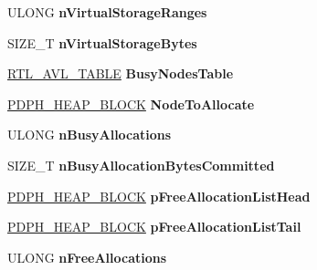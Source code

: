 \begin{DoxyCompactItemize}
U\+L\+O\+NG {\bfseries n\+Virtual\+Storage\+Ranges}
\item 
\mbox{\label{struct___d_p_h___h_e_a_p___r_o_o_t_af2c1adcebb06d8c3f59a7908e19c7254}} 
S\+I\+Z\+E\+\_\+T {\bfseries n\+Virtual\+Storage\+Bytes}
\item 
\mbox{\label{struct___d_p_h___h_e_a_p___r_o_o_t_aee63a9ea28ea465d0c269dd453b656b7}} 
\hyperlink{struct___r_t_l___a_v_l___t_a_b_l_e}{R\+T\+L\+\_\+\+A\+V\+L\+\_\+\+T\+A\+B\+LE} {\bfseries Busy\+Nodes\+Table}
\item 
\mbox{\label{struct___d_p_h___h_e_a_p___r_o_o_t_a3efe9f8864dd0c05b7c6e4eddb994f35}} 
\hyperlink{struct___d_p_h___h_e_a_p___b_l_o_c_k}{P\+D\+P\+H\+\_\+\+H\+E\+A\+P\+\_\+\+B\+L\+O\+CK} {\bfseries Node\+To\+Allocate}
\item 
\mbox{\label{struct___d_p_h___h_e_a_p___r_o_o_t_a06360060daafbf987fe4b50b352120ee}} 
U\+L\+O\+NG {\bfseries n\+Busy\+Allocations}
\item 
\mbox{\label{struct___d_p_h___h_e_a_p___r_o_o_t_ad9652bcdb33d2e7ff03a12c2bce2b5ba}} 
S\+I\+Z\+E\+\_\+T {\bfseries n\+Busy\+Allocation\+Bytes\+Committed}
\item 
\mbox{\label{struct___d_p_h___h_e_a_p___r_o_o_t_aefe3f19b29414e4d3dd8412ce706cd8f}} 
\hyperlink{struct___d_p_h___h_e_a_p___b_l_o_c_k}{P\+D\+P\+H\+\_\+\+H\+E\+A\+P\+\_\+\+B\+L\+O\+CK} {\bfseries p\+Free\+Allocation\+List\+Head}
\item 
\mbox{\label{struct___d_p_h___h_e_a_p___r_o_o_t_ae1418917533b8ad783d3d0750e41f43e}} 
\hyperlink{struct___d_p_h___h_e_a_p___b_l_o_c_k}{P\+D\+P\+H\+\_\+\+H\+E\+A\+P\+\_\+\+B\+L\+O\+CK} {\bfseries p\+Free\+Allocation\+List\+Tail}
\item 
\mbox{\label{struct___d_p_h___h_e_a_p___r_o_o_t_aa495d5b33ad9e6b73938242bebc63f50}} 
U\+L\+O\+NG {\bfseries n\+Free\+Allocations}
\item 
\mbox{\label{struct___d_p_h___h_e_a_p___r_o_o_t_adf7ea6f1b09f6f84f1a2af86292886cf}} 

\end{DoxyCompactItemize}
